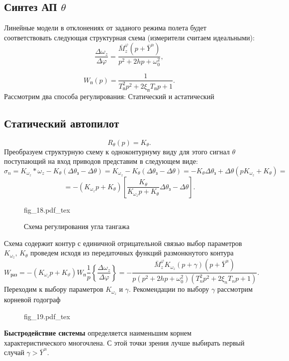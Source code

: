 \documentclass{article}
\begin{document}
\subsection{Синтез АП \texorpdfstring{$\theta$}{Lg}}
Линейные модели в отклонениях от заданого режима полета будет соответствовать следующая структурная схема (измерители считаем идеальными):
\[
	\frac{\Delta \omega_z}{\Delta \varphi} = \frac{\bar{M}_z^\varphi (p+\bar{Y}^\alpha)}{p^2 + 2hp + \omega_{0}^2},
\]

\[
	W_\text{п}(p) = \frac{1}{T_\text{п}^2 p^2 + 2 \xi_\text{п} T_\text{п} p + 1}.
\]
Рассмотрим два способа регулирования: 
Статический и астатический


\subsection{Статический автопилот}
\[
	R_{\theta}(p)= K_\theta.
\]
Преобразуем структурную схему к одноконтурнуму виду для этого сигнал $\theta$ поступающий на вход приводов представим в следующем виде: 
\[
	\sigma_n = K_{\omega_z}*\omega_z - K_\theta (\Delta \theta_\text{з} - \Delta \theta) = K_{\omega_z} - K_{\theta}(\Delta \theta_\text{з} - \Delta \theta) = -K_{\theta} \Delta \theta_\text{з} + \Delta \theta(p K_{\omega_z} + K_{\theta}) =
\]
\[
	= -(K_{\omega_z}p + K_\theta)[\frac{K_\theta}{K_{\omega_z}p + K_{\theta}}\Delta\theta_\text{з} - \Delta \theta].
\]

\begin{figure}[ht]
	\centering
	{fig_18.pdf_tex}
	\caption{Схема регулирования угла тангажа}
	\label{fig:18}
\end{figure}

Схема содержит контур с единичной отрицательной связью выбор параметров $K_{\omega_z}, \, K_{\theta}$ проведем исходя из передаточных функций размонкнутого контура
\[
	W_\text{раз} = -(K_{\omega_z} p + K_\vartheta) W_\text{п} \frac{1}{p}\left\{{\frac{\Delta \omega_z}{\Delta \varphi}}\right\} = -\frac{\bar{M}_z^\varphi K_{\omega_{z}}(p + \gamma)(p + \bar{Y}^\alpha)}{p(p^2 + 2hp + \omega_0^2)(T_n^2 p^2 + 2 \xi_n T_n p +1)}.
\]
Переходим к выбору параметров $K_{\omega_z}$ и $\gamma$.
Рекомендации по выбору $\gamma$ рассмотрим корневой годограф 

\begin{figure}[H]
	\centering
	{fig_19.pdf_tex}
\end{figure}

\textbf{Быстродействие системы} определяется наименьшим корнем характеристического многочлена.
С этой точки зрения лучше выбирать первый случай $\gamma > \bar{Y}^\alpha$.
\end{document}
